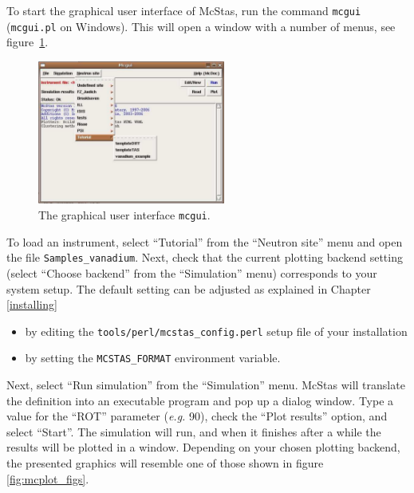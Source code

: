To start the graphical user interface of McStas, run the command
\verb+mcgui+ (\verb+mcgui.pl+ on Windows). This will open a window
with a number of menus,
see figure~\ref{fig:mcgui}. 
\begin{figure}[htb!]
  \begin{center}
    \includegraphics[width=0.55\textwidth]{figures/mcgui}
  \end{center}
\caption{The graphical user interface \texttt{mcgui}.}
\label{fig:mcgui}
\end{figure}
\label{p:neutronsite}
To load an instrument, select ``Tutorial'' from the ``Neutron site''
menu and open the file \verb+Samples_vanadium+. Next, check that the current plotting backend setting
(select ``Choose backend'' from the ``Simulation'' menu) corresponds
to your system setup. The default setting can be adjusted as explained in Chapter \ref{installing}
\begin{itemize}
\item{by editing
the \verb+tools/perl/mcstas_config.perl+ setup file of your
installation}
\item{by setting the \verb+MCSTAS_FORMAT+ environment
variable.}
\end{itemize} 
Next, select ``Run simulation'' from the ``Simulation'' menu.
McStas will translate the definition into an executable program and pop
up a dialog window. Type a value for the ``ROT'' parameter ({\em e.g.}
90), check the ``Plot results'' option, and select ``Start''. The
simulation will run, and when it finishes after a while the results will
be plotted in a window. Depending on your chosen plotting backend, the
presented graphics will resemble one of those shown in figure \ref{fig:mcplot_figs}.
